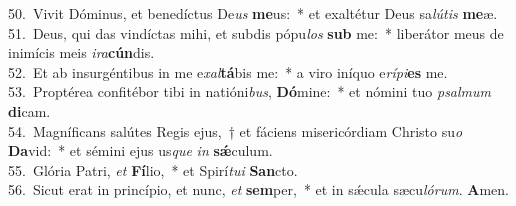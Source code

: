 {50.~}Vivit Dóminus, et benedíctus De\textit{us} \textbf{me}us:~* et exaltétur Deus sa\textit{lú}\textit{tis} \textbf{me}æ.\\
{51.~}Deus, qui das vindíctas mihi, et subdis pópu\textit{los} \textbf{sub} me:~* liberátor meus de inimícis meis \textit{i}\textit{ra}\textbf{cún}dis.\\
{52.~}Et ab insurgéntibus in me e\textit{xal}\textbf{tá}bis me:~* a viro iníquo e\textit{rí}\textit{pi}\textbf{es} me.\\
{53.~}Proptérea confitébor tibi in natióni\textit{bus}, \textbf{Dó}mine:~* et nómini tuo \textit{psal}\textit{mum} \textbf{di}cam.\\
{54.~}Magníficans salútes Regis ejus,~† et fáciens misericórdiam Christo su\textit{o} \textbf{Da}vid:~* et sémini ejus us\textit{que} \textit{in} \textbf{sǽ}culum.\\
{55.~}Glória Patri, \textit{et} \textbf{Fí}lio,~* et Spirí\textit{tu}\textit{i} \textbf{San}cto.\\
{56.~}Sicut erat in princípio, et nunc, \textit{et} \textbf{sem}per,~* et in sǽcula sæcu\textit{ló}\textit{rum}. \textbf{A}men.\\
